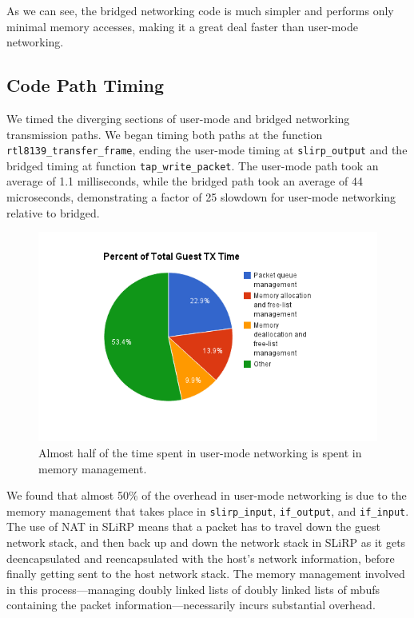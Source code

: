 As we can see, the bridged networking code is much simpler and performs only minimal memory accesses, making it a great deal faster than user-mode networking. 

\subsection{Code Path Timing}
\label{codePathTiming}
We timed the diverging sections of user-mode and bridged networking transmission paths. We began timing both paths at the function \texttt{rtl8139\_transfer\_frame}, ending the user-mode timing at \texttt{slirp\_output} and the bridged timing at function \texttt{tap\_write\_packet}. The user-mode path took an average of 1.1 milliseconds, while the bridged path took an average of 44 microseconds, demonstrating a factor of 25 slowdown for user-mode networking relative to bridged.

\begin{figure}[!htbp]
	\centering
		\includegraphics[scale=0.5]{usermodeTXtime}
	\caption{Almost half of the time spent in user-mode networking is spent in memory management.}
	\label{fig:usermodeTXtime}
\end{figure}

We found that almost 50\% of the overhead in user-mode networking is due to the memory management that takes place in \texttt{slirp\_input}, \texttt{if\_output}, and \texttt{if\_input}. The use of NAT in SLiRP means that a packet has to travel down the guest network stack, and then back up and down the network stack in SLiRP as it gets deencapsulated and reencapsulated with the host's network information, before finally getting sent to the host network stack. The memory management involved in this process---managing doubly linked lists of doubly linked lists of mbufs containing the packet information---necessarily incurs substantial overhead. 
